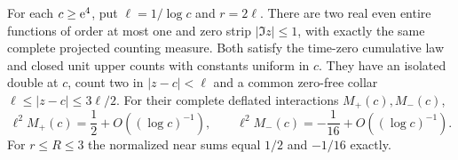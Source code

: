 \begin{proposition}
\label{gt-height-exact-count}
For each \(c\ge\mathrm e^4\), put \(\ell=1/\log c\) and \(r=2\ell\).
There are two real even entire functions of order at most one and
zero strip \(|\Im z|\le1\), with exactly the same complete projected
counting measure. Both satisfy the time-zero cumulative law and
closed unit upper counts with constants uniform in \(c\). They
have an isolated double at \(c\), count two in \(|z-c|<\ell\)
and a common zero-free collar \(\ell\le|z-c|\le3\ell/2\).
For their complete deflated interactions \(M_+(c),M_-(c)\),
\begin{equation}
 \ell^2 M_+(c)=\frac12+O((\log c)^{-1}),\qquad
 \ell^2 M_-(c)=-\frac1{16}+O((\log c)^{-1}).
 \label{gt-height-count-signs}
\end{equation}
For \(r\le R\le3\) the normalized near sums equal \(1/2\) and
\(-1/16\) exactly. \cite{gtcounts}
\end{proposition}
